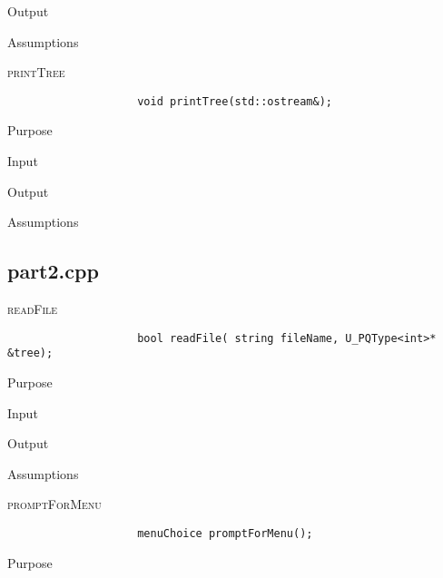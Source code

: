 \documentclass[pdftex, 12pt]{article}
\begin{document}
\begin{description}
\begin{description}
\begin{description}
\begin{description}
					\item{Output}

					\item{Assumptions}

				\end{description}
			\item{\textsc{printTree}}
				\begin{lstlisting}
					void printTree(std::ostream&);
				\end{lstlisting}
				\begin{description}

					\item{Purpose}

					\item{Input}

					\item{Output}

					\item{Assumptions}

				\end{description}
		\end{description}
		\subsection{part2.cpp}
		\begin{description}
			\item{\textsc{readFile}}
				\begin{lstlisting}
					bool readFile( string fileName, U_PQType<int>* &tree);
				\end{lstlisting}
				\begin{description}

					\item{Purpose}

					\item{Input}

					\item{Output}

					\item{Assumptions}

				\end{description}
			\item{\textsc{promptForMenu}}
				\begin{lstlisting}
					menuChoice promptForMenu();
				\end{lstlisting}
				\begin{description}

					\item{Purpose}


\end{description}
\end{description}
\end{description}
\end{description}
\end{document}
